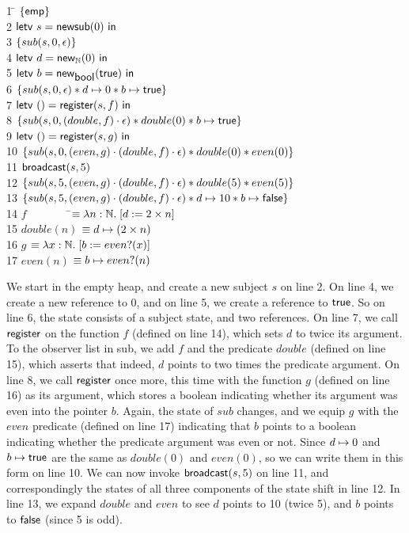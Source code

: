 \documentclass[preprint,natbib]{sigplanconf}
\begin{document}
{\small
\begin{tabbing}
1 \qquad \= 
$\{{\mathsf{emp}}\}$ \\
2 \> 
$\mbox{\textsf{{letv }}}s = \mbox{\textsf{{newsub}}}(0)\mbox{\textsf{{ in }}}$ \\
3 \> $\{{sub(s, 0, \epsilon)}\}$ \\
4 \> $\mbox{\textsf{{letv }}}d = \mbox{\textsf{{new}}}_{\mathbb{N}} (0)\mbox{\textsf{{ in }}}$ \\
5 \> $\mbox{\textsf{{letv }}}b = \mbox{\textsf{{new}}}_{\mbox{\textsf{{bool}}}} (\mbox{\textsf{{true}}})\mbox{\textsf{{ in }}}$ \\
6 \> $\{{sub(s, 0, \epsilon) * d \mapsto 0 * b \mapsto \mbox{\textsf{{true}}}}\}$\\
7 \> $\mbox{\textsf{{letv }}}() = \mbox{\textsf{{register}}}(s, f)\mbox{\textsf{{ in }}}$\\
8 \> $\{{sub(s, 0, (double, f)\cdot\epsilon) * double(0) * b \mapsto \mbox{\textsf{{true}}}}\}$ \\
9 \> $\mbox{\textsf{{letv }}}() = \mbox{\textsf{{register}}}(s, g)\mbox{\textsf{{ in }}}$\\
10 \> $\{{sub(s, 0, (even, g)\cdot(double, f)\cdot\epsilon) * double(0) * even(0)}\}$ \\
11 \> $\mbox{\textsf{{broadcast}}}(s, 5)$ \\
12 \> $\{{sub(s, 5, (even, g)\cdot(double, f)\cdot\epsilon) * double(5) * even(5)}\}$ \\
13 \> $\{{sub(s, 5, (even, g)\cdot(double, f)\cdot\epsilon) * d \mapsto 10 * b \mapsto \mbox{\textsf{{false}}}}\}$ 
\\[0.5em]
14 \> $f \qquad \qquad $\=$\equiv \lambda n:\mathbb{N}.\; [d := 2 \times n]$ \\
15 \> $double(n)$ \> $\equiv d \mapsto (2 \times n)$ \\
16 \> $g$ \> $\equiv \lambda x:\mathbb{N}.\; [b := even?(x)]$ \\
17 \> $even(n)$ \> $\equiv b \mapsto even?(n)$ \\
\end{tabbing}
}
We start in the empty heap, and create a new subject $s$ on line 2.
On line 4, we create a new reference to $0$, and on line 5, we create
a reference to $\mbox{\textsf{{true}}}$. So on line 6, the state consists of a
subject state, and two references.  On line 7, we call
$\mbox{\textsf{{register}}}$ on the function $f$ (defined on line 14), which
sets $d$ to twice its argument. To the observer list in sub, we add
$f$ and the predicate $double$ (defined on line 15), which asserts
that indeed, $d$ points to two times the predicate argument. On line
8, we call $\mbox{\textsf{{register}}}$ once more, this time with the function
$g$ (defined on line 16) as its argument, which stores a boolean
indicating whether its argument was even into the pointer $b$. Again,
the state of $sub$ changes, and we equip $g$ with the $even$ predicate
(defined on line 17) indicating that $b$ points to a boolean
indicating whether the predicate argument was even or not. Since $d
\mapsto 0$ and $b \mapsto \mbox{\textsf{{true}}}$ are the same as
$double(0)$ and $even(0)$, so we can write them in this form on line
10.  We can now invoke $\mbox{\textsf{{broadcast}}}(s, 5)$ on line 11, and
correspondingly the states of all three components of the state shift
in line 12.  In line 13, we expand $double$ and $even$ to see $d$
points to 10 (twice 5), and $b$ points to $\mbox{\textsf{{false}}}$ (since 5
is odd).
\end{document}
